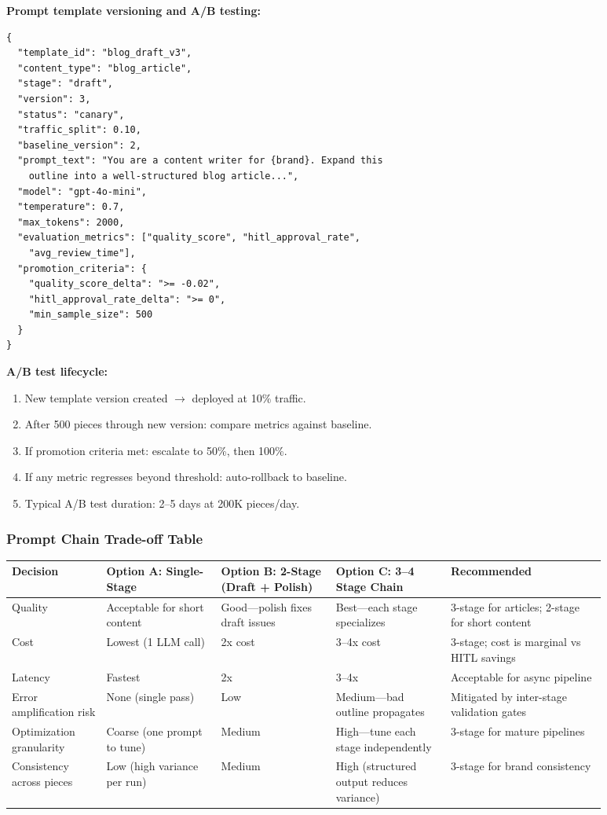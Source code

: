 \textbf{Prompt template versioning and A/B testing:}

\begin{verbatim}
{
  "template_id": "blog_draft_v3",
  "content_type": "blog_article",
  "stage": "draft",
  "version": 3,
  "status": "canary",
  "traffic_split": 0.10,
  "baseline_version": 2,
  "prompt_text": "You are a content writer for {brand}. Expand this
    outline into a well-structured blog article...",
  "model": "gpt-4o-mini",
  "temperature": 0.7,
  "max_tokens": 2000,
  "evaluation_metrics": ["quality_score", "hitl_approval_rate",
    "avg_review_time"],
  "promotion_criteria": {
    "quality_score_delta": ">= -0.02",
    "hitl_approval_rate_delta": ">= 0",
    "min_sample_size": 500
  }
}
\end{verbatim}

\textbf{A/B test lifecycle:}
\begin{enumerate}
  \item New template version created $\rightarrow$ deployed at 10\% traffic.
  \item After 500 pieces through new version: compare metrics against baseline.
  \item If promotion criteria met: escalate to 50\%, then 100\%.
  \item If any metric regresses beyond threshold: auto-rollback to baseline.
  \item Typical A/B test duration: 2--5 days at 200K pieces/day.
\end{enumerate}

\subsubsection*{Prompt Chain Trade-off Table}

\begin{tabular}{|p{0.14\linewidth}|p{0.17\linewidth}|p{0.17\linewidth}|p{0.17\linewidth}|p{0.23\linewidth}|}
\hline
\textbf{Decision} & \textbf{Option A: Single-Stage} & \textbf{Option B: 2-Stage (Draft + Polish)} & \textbf{Option C: 3--4 Stage Chain} & \textbf{Recommended} \\
\hline
Quality & Acceptable for short content & Good---polish fixes draft issues & Best---each stage specializes & 3-stage for articles; 2-stage for short content \\
\hline
Cost & Lowest (1 LLM call) & 2x cost & 3--4x cost & 3-stage; cost is marginal vs HITL savings \\
\hline
Latency & Fastest & 2x & 3--4x & Acceptable for async pipeline \\
\hline
Error amplification risk & None (single pass) & Low & Medium---bad outline propagates & Mitigated by inter-stage validation gates \\
\hline
Optimization granularity & Coarse (one prompt to tune) & Medium & High---tune each stage independently & 3-stage for mature pipelines \\
\hline
Consistency across pieces & Low (high variance per run) & Medium & High (structured output reduces variance) & 3-stage for brand consistency \\
\hline
\end{tabular}

